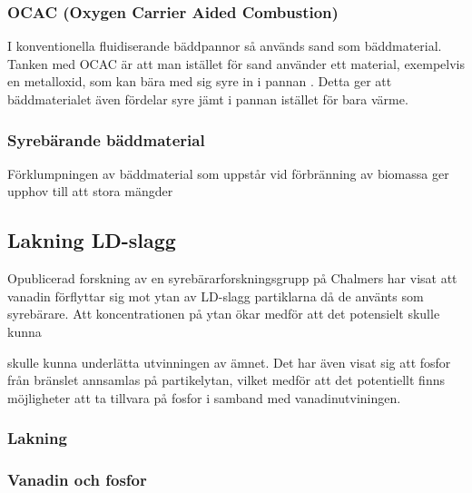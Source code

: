 \subsubsection{OCAC (Oxygen Carrier Aided Combustion)}
I konventionella fluidiserande bäddpannor så används sand som bäddmaterial. Tanken med OCAC är att man istället för sand använder ett material, exempelvis en metalloxid, som kan bära med sig syre in i pannan \cite{doi:10.1021/acs.energyfuels.7b00197}. Detta ger att bäddmaterialet även fördelar syre jämt i pannan istället för bara värme.


\subsubsection{Syrebärande bäddmaterial}
Förklumpningen av bäddmaterial som uppstår vid förbränning av biomassa ger upphov till att stora mängder 



\subsection{Lakning LD-slagg}

Opublicerad forskning av en syrebärarforskningsgrupp på Chalmers har visat att vanadin förflyttar sig mot ytan av LD-slagg partiklarna då de använts som syrebärare. Att koncentrationen på ytan ökar medför att det potensielt skulle kunna

skulle kunna underlätta utvinningen av ämnet. Det har även visat sig att fosfor från bränslet annsamlas på partikelytan, vilket medför att det potentiellt finns möjligheter att ta tillvara på fosfor i samband med vanadinutviningen.  

\subsubsection{Lakning}

\subsubsection{Vanadin och fosfor}
